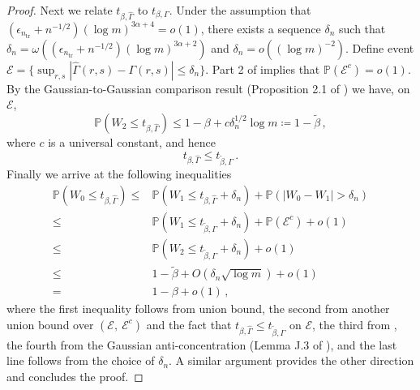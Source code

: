 \documentclass[11pt]{article}
\theoremstyle{plain}
\newcommand{\tr}{{\mathrm{tr}}}
\begin{document}
\begin{proof}
Next we relate $t_{\beta,\hat\Gamma}$ to $t_{\beta,\Gamma}$. Under the assumption that $(\epsilon_{n_\tr}+n^{-1/2})(\log m)^{3\alpha+4}=o(1)$, there exists a sequence $\delta_n$ such that $\delta_n=\omega\left((\epsilon_{n_\tr}+n^{-1/2})(\log m)^{3\alpha+2}\right)$ and $\delta_n=o((\log m)^{-2})$.
Define event $\mathcal E = \{\sup_{r,s}|\hat\Gamma(r,s)-\Gamma(r,s)|\le \delta_n\}$.
Part 2 of  implies that $\mathbb P(\mathcal E^c)=o(1)$.
By the Gaussian-to-Gaussian comparison result (Proposition 2.1 of \cite{chernozhukov2022improved}) we have, on $\mathcal E$,
$$
\mathbb P(W_2\le t_{\beta,\hat\Gamma})\le 1-\beta+ c \delta_n^{1/2}\log m \coloneqq 1-\tilde\beta\,,
$$
where $c$ is a universal constant, and  hence
$$
t_{\beta,\hat\Gamma}\le t_{\tilde\beta,\Gamma}\,.
$$
Finally we arrive at the following inequalities
\begin{align*}
    \mathbb P(W_0\le t_{\beta,\hat\Gamma})\le & \mathbb P(W_1\le t_{\beta,\hat\Gamma}+\delta_n)+\mathbb P(|W_0-W_1|>\delta_n)\\
    \le &\mathbb P(W_1\le t_{\tilde\beta,\Gamma}+\delta_n)+\mathbb P(\mathcal E^c)+o(1)\\
    \le &\mathbb P(W_2\le t_{\tilde\beta,\Gamma}+\delta_n)+o(1)\\
    \le & 1-\tilde\beta+O(\delta_n\sqrt{\log m})+o(1)\\
    = & 1-\beta+o(1)\,,
\end{align*}
where the first inequality follows from union bound, the second from another union bound over $(\mathcal E,~\mathcal E^c)$ and the fact that $t_{\beta,\hat\Gamma}\le t_{\tilde\beta,\Gamma}$ on $\mathcal E$, the third from , the fourth  from the Gaussian anti-concentration (Lemma J.3 of \cite{chernozhukov2022improved}),  and the last line follows from the choice of $\delta_n$.  A similar argument provides the other direction and concludes the proof.
\end{proof}
\end{document}
